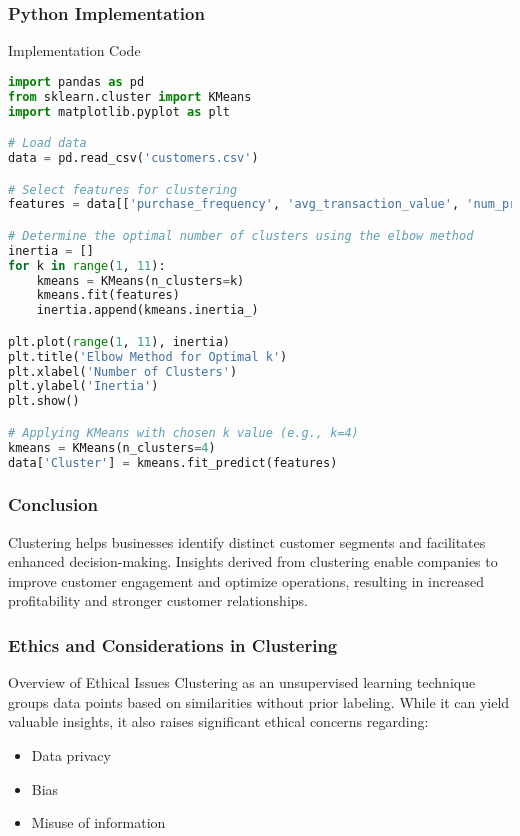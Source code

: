 \documentclass[aspectratio=169]{beamer}
\begin{document}
\begin{frame}[fragile]
    \frametitle{Python Implementation}
    \begin{block}{Implementation Code}
    \begin{lstlisting}[language=Python]
import pandas as pd
from sklearn.cluster import KMeans
import matplotlib.pyplot as plt

# Load data
data = pd.read_csv('customers.csv')

# Select features for clustering
features = data[['purchase_frequency', 'avg_transaction_value', 'num_products']]

# Determine the optimal number of clusters using the elbow method
inertia = []
for k in range(1, 11):
    kmeans = KMeans(n_clusters=k)
    kmeans.fit(features)
    inertia.append(kmeans.inertia_)

plt.plot(range(1, 11), inertia)
plt.title('Elbow Method for Optimal k')
plt.xlabel('Number of Clusters')
plt.ylabel('Inertia')
plt.show()

# Applying KMeans with chosen k value (e.g., k=4)
kmeans = KMeans(n_clusters=4)
data['Cluster'] = kmeans.fit_predict(features)
    \end{lstlisting}
    \end{block}
\end{frame}

\begin{frame}[fragile]
    \frametitle{Conclusion}
    Clustering helps businesses identify distinct customer segments and facilitates enhanced decision-making. 
    Insights derived from clustering enable companies to improve customer engagement and optimize operations, resulting in increased profitability and stronger customer relationships.
\end{frame}

\begin{frame}[fragile]
    \frametitle{Ethics and Considerations in Clustering}
    \begin{block}{Overview of Ethical Issues}
        Clustering as an unsupervised learning technique groups data points based on similarities without prior labeling. While it can yield valuable insights, it also raises significant ethical concerns regarding:
        \begin{itemize}
            \item Data privacy
            \item Bias
            \item Misuse of information
        \end{itemize}
    \end{block}
\end{frame}
\end{document}
